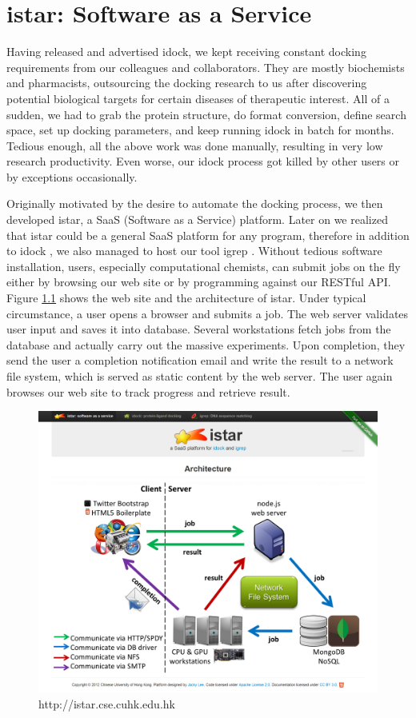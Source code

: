 \chapter{istar: Software as a Service}

Having released and advertised idock, we kept receiving constant docking requirements from our colleagues and collaborators. They are mostly biochemists and pharmacists, outsourcing the docking research to us after discovering potential biological targets for certain diseases of therapeutic interest. All of a sudden, we had to grab the protein structure, do format conversion, define search space, set up docking parameters, and keep running idock in batch for months. Tedious enough, all the above work was done manually, resulting in very low research productivity. Even worse, our idock process got killed by other users or by exceptions occasionally.

Originally motivated by the desire to automate the docking process, we then developed istar, a SaaS (Software as a Service) platform. Later on we realized that istar could be a general SaaS platform for any program, therefore in addition to idock \citep{1153}, we also managed to host our tool igrep \citep{1138}. Without tedious software installation, users, especially computational chemists, can submit jobs on the fly either by browsing our web site or by programming against our RESTful API. Figure \ref{istar:istar} shows the web site and the architecture of istar. Under typical circumstance, a user opens a browser and submits a job. The web server validates user input and saves it into database. Several workstations fetch jobs from the database and actually carry out the massive experiments. Upon completion, they send the user a completion notification email and write the result to a network file system, which is served as static content by the web server. The user again browses our web site to track progress and retrieve result.

\begin{figure}
\centering
\includegraphics[width=\linewidth]{istar/istar.png}
\caption{http://istar.cse.cuhk.edu.hk}
\label{istar:istar}
\end{figure}

